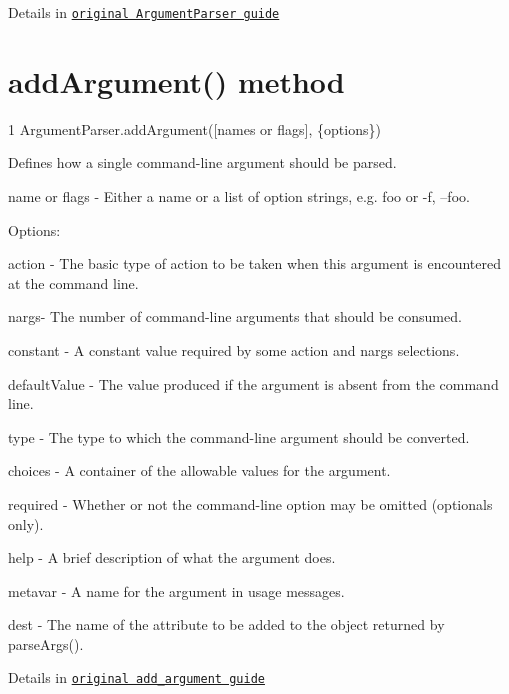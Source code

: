 Details in \href{http://docs.python.org/dev/library/argparse.html#argumentparser-objects}{\tt original Argument\+Parser guide}

\section*{add\+Argument() method }


\begin{DoxyCode}
1 ArgumentParser.addArgument([names or flags], \{options\})
\end{DoxyCode}


Defines how a single command-\/line argument should be parsed.


\begin{DoxyItemize}
\item {\ttfamily name or flags} -\/ Either a name or a list of option strings, e.\+g. foo or -\/f, --foo.
\end{DoxyItemize}

Options\+:


\begin{DoxyItemize}
\item {\ttfamily action} -\/ The basic type of action to be taken when this argument is encountered at the command line.
\item {\ttfamily nargs}-\/ The number of command-\/line arguments that should be consumed.
\item {\ttfamily constant} -\/ A constant value required by some action and nargs selections.
\item {\ttfamily default\+Value} -\/ The value produced if the argument is absent from the command line.
\item {\ttfamily type} -\/ The type to which the command-\/line argument should be converted.
\item {\ttfamily choices} -\/ A container of the allowable values for the argument.
\item {\ttfamily required} -\/ Whether or not the command-\/line option may be omitted (optionals only).
\item {\ttfamily help} -\/ A brief description of what the argument does.
\item {\ttfamily metavar} -\/ A name for the argument in usage messages.
\item {\ttfamily dest} -\/ The name of the attribute to be added to the object returned by parse\+Args().
\end{DoxyItemize}

Details in \href{http://docs.python.org/dev/library/argparse.html#the-add-argument-method}{\tt original add\+\_\+argument guide}

